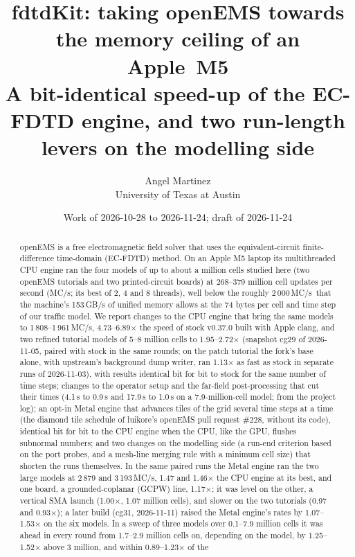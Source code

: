 \documentclass[10pt,a4paper]{article}
\title{\vspace{-1cm}fdtdKit: taking openEMS towards the memory ceiling of an Apple~M5\\
\large A bit-identical speed-up of the EC-FDTD engine, and two run-length levers on the modelling side}
\author{Angel Martinez\\ University of Texas at Austin}
\date{Work of 2026-10-28 to 2026-11-24; draft of 2026-11-24}
\newcommand{\MC}{MC/s}
\begin{document}
\sloppy
\maketitle
\vspace{-0.6cm}

\begin{abstract}
openEMS is a free electromagnetic field solver that uses the equivalent-circuit finite-difference time-domain
(EC-FDTD) method. On an Apple M5 laptop its multithreaded CPU engine ran the four models of up to about a million cells
studied here (two openEMS tutorials and two printed-circuit boards) at 268--379 million cell updates per second (\MC;
its best of 2, 4 and 8 threads), well below the roughly 2\,000\,\MC\ that the machine's 153\,GB/s of unified memory
allows at the 74 bytes per cell and time step of our traffic model. We report changes to the CPU engine that bring the
same models to 1\,808--1\,961\,\MC, 4.73--6.89$\times$ the speed of stock v0.37.0 built with Apple clang, and two
refined tutorial models of 5--8 million cells to 1.95--2.72$\times$ (snapshot cg29 of 2026-11-05, paired with stock in
the same rounds; on the patch tutorial the fork's base alone, with upstream's background dump writer, ran 1.13$\times$
as fast as stock in separate runs of 2026-11-03), with results identical bit for bit to stock for the same number of
time steps; changes to the operator setup
and the far-field post-processing that cut their times (4.1\,s to 0.9\,s and 17.9\,s to 1.0\,s on a 7.9-million-cell
model; from the project log); an opt-in Metal engine that advances tiles of the grid several time steps at a time (the
diamond tile schedule of luikore's openEMS pull request \#228, without its code), identical bit for bit to the CPU
engine when the CPU, like the GPU, flushes subnormal numbers; and two changes on the modelling side (a run-end
criterion based on the port probes, and a mesh-line merging rule with a minimum cell size) that shorten the runs
themselves. In the same paired runs the Metal engine ran the two large models at 2\,879 and 3\,193\,\MC, 1.47 and
1.46$\times$ the CPU engine at its best, and one board, a grounded-coplanar (GCPW) line, 1.17$\times$; it was level on
the other, a vertical SMA launch (1.00$\times$, 1.07 million cells), and slower on the two tutorials (0.97 and
0.93$\times$); a later build (cg31, 2026-11-11) raised the Metal engine's rates by 1.07--1.53$\times$ on the six models.
In a sweep of three models over 0.1--7.9 million cells it was ahead in every round from 1.7--2.9
million cells on, depending on the model, by 1.25--1.52$\times$ above 3 million, and within 0.89--1.23$\times$ of the

\end{abstract}
\end{document}
